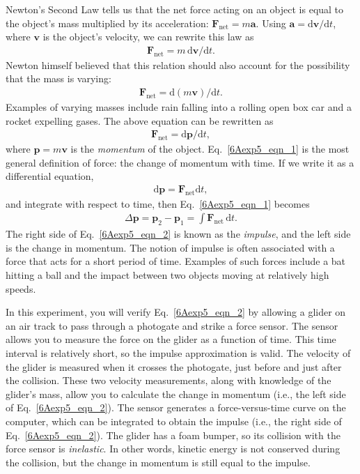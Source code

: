 Newton's Second Law tells us that the net force acting on an object is equal to the object's mass multiplied by its acceleration: \(\textbf{F}_{\textrm{net}} = m\textbf{a}\).  Using \(\textbf{a} = \textrm{d}\textbf{v}/\textrm{d}t\), where \(\textbf{v}\) is the object's velocity, we can rewrite this law as
\begin{align} \textbf{F}_{\textrm{net}} =  m\,\textrm{d}\textbf{v}/\textrm{d}t. \end{align}
Newton himself believed that this relation should also account for the possibility that the mass is varying:
\begin{align} \textbf{F}_{\textrm{net}} = \textrm{d}(m\textbf{v})/\textrm{d}t. \end{align}
Examples of varying masses include rain falling into a rolling open box car and a rocket expelling gases.  The above equation can be rewritten as
\begin{align} \textbf{F}_{\textrm{net}} = \textrm{d}\textbf{p}/\textrm{d}t, \label{6Aexp5_eqn_1} \end{align}
where \(\textbf{p} = m\textbf{v}\) is the \textit{momentum} of the object.  Eq.~\ref{6Aexp5_eqn_1} is the most general definition of force: the change of momentum with time.  If we write it as a differential equation,
\begin{align} \textrm{d}\textbf{p} = \textbf{F}_{\textrm{net}} \textrm{d}t, \end{align}
and integrate with respect to time, then Eq.~\ref{6Aexp5_eqn_1} becomes
\begin{align} \Delta \textbf{p} = \textbf{p}_2 - \textbf{p}_1 = \int \textbf{F}_{\textrm{net}}\,\textrm{d}t. \label{6Aexp5_eqn_2} \end{align}
The right side of Eq.~\ref{6Aexp5_eqn_2} is known as the \textit{impulse}, and the left side is the change in momentum.  The notion of impulse is often associated with a force that acts for a short period of time.  Examples of such forces include a bat hitting a ball and the impact between two objects moving at relatively high speeds.

In this experiment, you will verify Eq.~\ref{6Aexp5_eqn_2} by allowing a glider on an air track to pass through a photogate and strike a force sensor.  The sensor allows you to measure the force on the glider as a function of time.  This time interval is relatively short, so the impulse approximation is valid.  The velocity of the glider is measured when it crosses the photogate, just before and just after the collision.  These two velocity measurements, along with knowledge of the glider's mass, allow you to calculate the change in momentum (i.e., the left side of Eq.~\ref{6Aexp5_eqn_2}).  The sensor generates a force-versus-time curve on the computer, which can be integrated to obtain the impulse (i.e., the right side of Eq.~\ref{6Aexp5_eqn_2}).  The glider has a foam bumper, so its collision with the force sensor is \textit{inelastic}.  In other words, kinetic energy is not conserved during the collision, but the change in momentum is still equal to the impulse.

